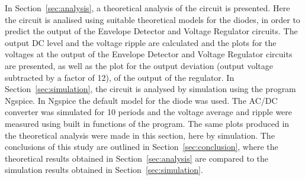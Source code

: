 In Section~\ref{sec:analysis}, a theoretical analysis of the circuit is
presented. Here the circuit is analised using suitable theoretical models for the diodes, in order to predict the output of the Envelope Detector
and Voltage Regulator circuits. The output DC level and the
voltage ripple are calculated and the plots for the voltages at the output of the Envelope Detector and Voltage Regulator circuits are presented, as well as the plot for the output deviation (output voltage subtracted by a factor of 12), of the output of the regulator. 
In Section~\ref{sec:simulation}, the circuit is analysed by
simulation using the program Ngspice. In Ngspice the default model for the diode was used. The AC/DC converter was simulated for 10 periods and the voltage average and ripple were measured using built in functions of the program. The same plots produced in the theoretical analysis were made in this section, here by simulation. The conclusions of this study are outlined in
Section~\ref{sec:conclusion}, where the theoretical results obtained in
Section~\ref{sec:analysis} are compared to the simulation results obtained in
Section~\ref{sec:simulation}.





\pagebreak

